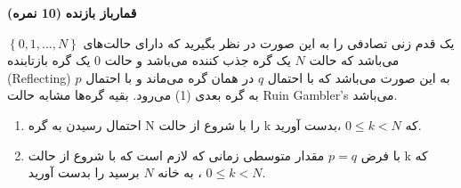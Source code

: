 \Large \textbf{قمارباز بازنده}
\large \textbf{(10 نمره)}

\normalsize \vspace{0.5cm}

یک قدم زنی تصادفی را به این صورت در نظر بگیرید که دارای حالت‌های
$\left\{ {0,1, \ldots ,N} \right\}$
 می‌باشد که حالت $N$ یک گره جذب کننده می‌باشد و حالت $0$ یک گره بازتابنده (Reflecting) به این صورت می‌باشد که با احتمال $q$ در همان گره می‌ماند و با احتمال $p$ به گره بعدی (1) می‌رود.‌ بقیه گره‌ها مشابه حالت Ruin Gambler's می‌باشد.
 
\begin{enumerate}[label=(\alph*)]
	
	\item
	احتمال رسیدن به گره N را با شروع از حالت k که
	$0 \le k < N$
	،بدست آورید.
	\item
	با فرض
	$p=q$
	مقدار متوسطی زمانی که لازم است که با شروع از حالت k که
	$0 \le k < N$
	، به خانه $N$ برسید را بدست آورید.
	
\end{enumerate}